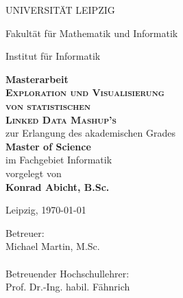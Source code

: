 \documentclass[11pt]{article}
\begin{document}
	
    \begin{titlepage}
        \begin{center}

            \vspace*{1cm}
            
            \centerline{\uppercase{Universität Leipzig}}
            \centerline{Fakultät für Mathematik und Informatik}
            \centerline{Institut für Informatik}
            
            \vspace*{2cm}
            
            \textbf{Masterarbeit}\\[0.3cm]

            \textsc{\huge \textbf{Exploration und Visualisierung\\ von statistischen\\[0.5cm] Linked Data Mashup's}}\\[2cm]
            
            {\large zur Erlangung des akademischen Grades}\\[0.5cm]
            
            {\huge \textbf{Master of Science}}\\[0.7cm]
            
            {\large im Fachgebiet Informatik}\\[1cm]
            
            vorgelegt von \\[0.5cm] 
            {\Large \textbf{Konrad Abicht, B.Sc.}}\\[2.5cm]

            \vfill
            \noindent\begin{minipage}[t]{.49\linewidth}
                Leipzig, \today
            \end{minipage}\hfill
            \begin{minipage}[t]{5cm}
                Betreuer:\\
                Michael Martin, M.Sc. \\\\
                
                Betreuender Hochschullehrer:\\
                Prof. Dr.-Ing. habil. Fähnrich
            \end{minipage}\par

        \end{center}
    \end{titlepage}
 
\end{document}
